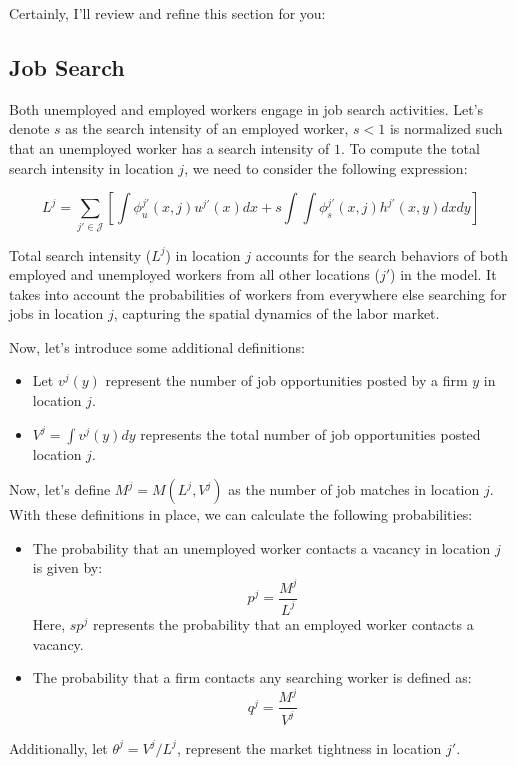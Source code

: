 \documentclass[
  letterpaper,
  DIV=11,
  numbers=noendperiod]{scrreprt}
\begin{document}
Certainly, I'll review and refine this section for you:

\hypertarget{job-search}{%
\subsection{Job Search}\label{job-search}}

Both unemployed and employed workers engage in job search activities.
Let's denote \(s\) as the search intensity of an employed worker,
\(s < 1\) is normalized such that an unemployed worker has a search
intensity of \(1\). To compute the total search intensity in location
\(j\), we need to consider the following expression:

\[
L^j = \sum_{j'\in\mathcal{J}}\left[\int \phi_u^{j'}(x,j)u^{j'}(x) dx + s\int\int \phi_s^{j'}(x,j)h^{j'}(x,y)dx dy\right]
\]

Total search intensity (\(L^j\)) in location \(j\) accounts for the
search behaviors of both employed and unemployed workers from all other
locations (\(j'\)) in the model. It takes into account the probabilities
of workers from everywhere else searching for jobs in location \(j\),
capturing the spatial dynamics of the labor market.

Now, let's introduce some additional definitions:

\begin{itemize}
\item
  Let \(v^j(y)\) represent the number of job opportunities posted by a
  firm \(y\) in location \(j\).
\item
  \(V^j = \int v^j(y) dy\) represents the total number of job
  opportunities posted location \(j\).
\end{itemize}

Now, let's define \(M^j = M(L^j, V^j)\) as the number of job matches in
location \(j\). With these definitions in place, we can calculate the
following probabilities:

\begin{itemize}
\item
  The probability that an unemployed worker contacts a vacancy in
  location \(j\) is given by: \[p^j = \frac{M^j}{L^j}\] Here, \(sp^j\)
  represents the probability that an employed worker contacts a vacancy.
\item
  The probability that a firm contacts any searching worker is defined
  as: \[q^j = \frac{M^j}{V^j}\]
\end{itemize}

Additionally, let \(\theta^j = V^j / L^j\), represent the market
tightness in location \(j'\).
\end{document}
